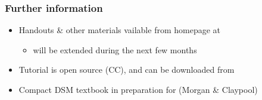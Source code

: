 \begin{frame}
  \frametitle{Further information}

  \begin{itemize}
  \item Handouts \& other materials vailable from homepage at
    \begin{center}
    \end{center}
    \begin{itemize}
    \item[\hand] will be extended during the next few months
    \end{itemize}
  \item Tutorial is open source (CC), and can be downloaded from
    \begin{center}\footnotesize
    \end{center}
  \item Compact DSM textbook in preparation for  (Morgan \& Claypool)
  \end{itemize}

  \gap[1]
  \begin{center}
  \end{center}
\end{frame}

